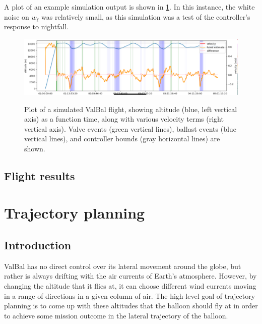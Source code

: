 \documentclass[11pt]{scrartcl} %
\begin{document}
A plot of an example simulation output is shown in \ref{lsim}. In this instance, the white noise on $w_{\dot \ell}$ was relatively small, as this simulation was a test of the controller's response to nightfall.
\begin{figure}[h]
\includegraphics[width=1\linewidth]{lsim.png}
\label{lsim}
\caption{Plot of a simulated ValBal flight, showing altitude (blue, left vertical axis) as a function time, along with various velocity terms (right vertical axis). Valve events (green vertical lines), ballast events (blue vertical lines), and controller bounds (gray horizontal lines) are shown.}
\end{figure}

\subsection{Flight results}

\newpage
\section{Trajectory planning}
\label{TP}
\subsection{Introduction}

ValBal has no direct control over its lateral movement around the globe, but rather is always drifting with the air currents of Earth's atmosphere. However, by changing the altitude that it flies at, it can choose different wind currents moving in a range of directions in a given column of air. The high-level goal of trajectory planning is to come up with these altitudes that the balloon should fly at in order to achieve some mission outcome in the lateral trajectory of the balloon.

\end{document}
